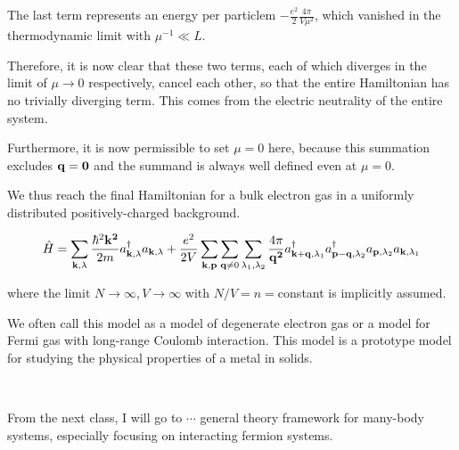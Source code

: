 The last term represents an energy per particlem $-\displaystyle\frac{e^2}{2}\frac{4\pi}{V\mu^2}$, which vanished in the thermodynamic limit with $\mu^{-1}\ll L$. 

Therefore, it is now clear that these two terms, each of which diverges in the limit of $\mu\to0$ respectively, cancel each other, so that the entire Hamiltonian has no trivially diverging term. This comes from the electric neutrality of the entire system. 

Furthermore, it is now permissible to set $\mu=0$ here, because this summation excludes $\bf q=0$ and the summand is always well defined even at $\mu =0$. 

We thus reach the final Hamiltonian for a bulk electron gas in a uniformly distributed positively-charged background. 

\begin{align}\label{eq1.8.14}
\hat{H}=\sum_{{\bf k},\lambda}\frac{\hbar^2\bf k^2}{2m}a^\dagger_{{\bf k},\lambda}a_{{\bf k},\lambda} + \frac{e^2}{2V}\sum_{\bf k,p} \sum_{{\bf q}\neq0}\sum_{\lambda_1,\lambda_2}\frac{4\pi}{{\bf q^2}}a^\dagger_{{\bf k+q},\lambda_1}a^\dagger_{{\bf p-q},\lambda_2}a_{{\bf p},\lambda_2}a_{{\bf k},\lambda_1}
\end{align}

where the limit $N\to\infty, V\to\infty$ with $N/V=n=$constant is implicitly assumed. 

We often call this model as a model of degenerate electron gas or a model for Fermi gas with long-range Coulomb interaction. This model is a prototype model for studying the physical properties of a metal in solids. 

\dotfill

\ 

From the next class, I will go to $\cdots$ general theory framework for many-body systems, especially focusing on interacting fermion systems. 